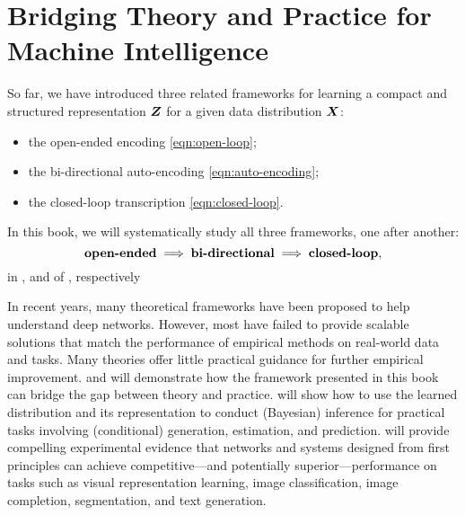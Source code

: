 \documentclass[../../book-main.tex]{subfiles}
\begin{document}
\section{Bridging Theory and Practice for Machine Intelligence}
So far, we have introduced three related frameworks for learning a compact and structured representation $\bm{Z}$ for a given data distribution $\bm{X}$:
\begin{itemize}
\item the open-ended encoding \eqref{eqn:open-loop};
\item the bi-directional auto-encoding \eqref{eqn:auto-encoding};
\item the closed-loop transcription \eqref{eqn:closed-loop}.
\end{itemize}
In this book, we will systematically study all three frameworks, one after another:
\begin{equation}
    \text{\textbf{open-ended}} \; \Longrightarrow \; 
    \text{\textbf{bi-directional}} \; \Longrightarrow \; \text{\textbf{closed-loop}},
\end{equation}
in ,  and  of , respectively

In recent years, many theoretical frameworks have been proposed to help understand deep networks. However, most have failed to provide scalable solutions that match the performance of empirical methods on real-world data and tasks. Many theories offer little practical guidance for further empirical improvement.  and  will demonstrate how the framework presented in this book can bridge the gap between theory and practice.  will show how to use the learned distribution and its representation to conduct (Bayesian) inference for practical tasks involving (conditional) generation, estimation, and prediction.  will provide compelling experimental evidence that networks and systems designed from first principles can achieve competitive---and potentially superior---performance on tasks such as visual representation learning, image classification, image completion, segmentation, and text generation.
\end{document}
